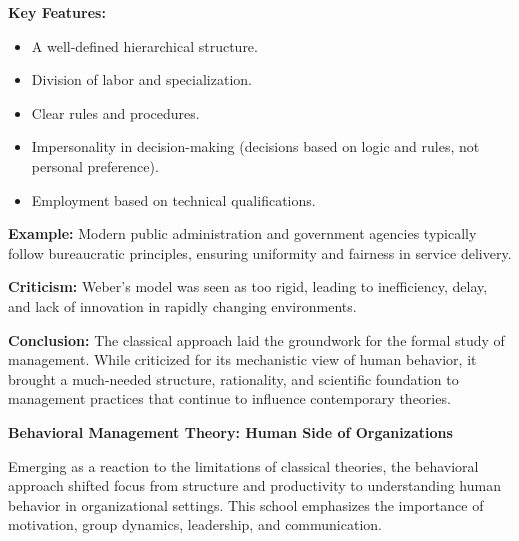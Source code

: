 \documentclass[12pt,a4paper]{book}
\begin{document}
\begin{enumerate}
    \textbf{Key Features:}
    \begin{itemize}
        \item A well-defined hierarchical structure.
        \item Division of labor and specialization.
        \item Clear rules and procedures.
        \item Impersonality in decision-making (decisions based on logic and rules, not personal preference).
        \item Employment based on technical qualifications.
    \end{itemize}

    \textbf{Example:} Modern public administration and government agencies typically follow bureaucratic principles, ensuring uniformity and fairness in service delivery.

    \textbf{Criticism:} Weber’s model was seen as too rigid, leading to inefficiency, delay, and lack of innovation in rapidly changing environments.
\end{enumerate}

\textbf{Conclusion:} The classical approach laid the groundwork for the formal study of management. While criticized for its mechanistic view of human behavior, it brought a much-needed structure, rationality, and scientific foundation to management practices that continue to influence contemporary theories.



\textbf{Behavioral Management Theory: Human Side of Organizations}

Emerging as a reaction to the limitations of classical theories, the behavioral approach shifted focus from structure and productivity to understanding human behavior in organizational settings. This school emphasizes the importance of motivation, group dynamics, leadership, and communication.
\end{document}
